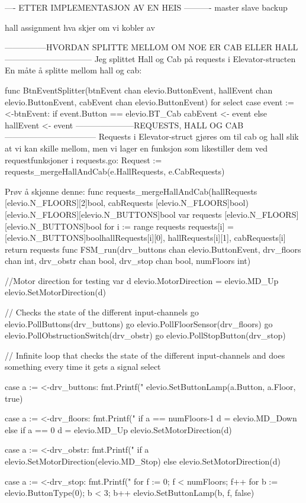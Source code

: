 
---- ETTER IMPLEMENTASJON AV EN HEIS ----------
master slave
backup

hall assignment
hva skjer om vi kobler av


---------------HVORDAN SPLITTE MELLOM OM NOE ER CAB ELLER HALL--------------------------------
Jeg splittet Hall og Cab på requests i Elevator-structen
En måte å splitte mellom hall og cab:

func BtnEventSplitter(btnEvent chan elevio.ButtonEvent,
	hallEvent chan elevio.ButtonEvent,
	cabEvent chan elevio.ButtonEvent) {
	for {
		select {
		case event := <-btnEvent:
			if event.Button == elevio.BT_Cab {
				cabEvent <- event
			} else {
				hallEvent <- event
			}
		}
	}
}
---------------------REQUESTS, HALL OG CAB---------------------------------
Requests i Elevator-struct gjøres om til cab og hall slik at vi kan skille mellom, men vi lager en funksjon 
som likestiller dem ved requestfunksjoner i requests.go:
Request := requests_mergeHallAndCab(e.HallRequests, e.CabRequests)

Prøv å skjønne denne: 
func requests_mergeHallAndCab(hallRequests [elevio.N_FLOORS][2]bool, cabRequests [elevio.N_FLOORS]bool) [elevio.N_FLOORS][elevio.N_BUTTONS]bool {
	var requests [elevio.N_FLOORS][elevio.N_BUTTONS]bool
	for i := range requests {
		requests[i] = [elevio.N_BUTTONS]bool{hallRequests[i][0], hallRequests[i][1], cabRequests[i]}
	}
	return requests
}
func FSM_run(drv_buttons chan elevio.ButtonEvent, drv_floors chan int, drv_obstr chan bool, drv_stop chan bool, numFloors int) {

	//Motor direction for testing
	var d elevio.MotorDirection = elevio.MD_Up
	elevio.SetMotorDirection(d)


	// Checks the state of the different input-channels
	go elevio.PollButtons(drv_buttons)
	go elevio.PollFloorSensor(drv_floors)
	go elevio.PollObstructionSwitch(drv_obstr)
	go elevio.PollStopButton(drv_stop)

	// Infinite loop that checks the state of the different input-channels and does something every time it gets a signal
	select {
	case a := <-drv_buttons:
		fmt.Printf("%
		elevio.SetButtonLamp(a.Button, a.Floor, true)

	case a := <-drv_floors:
		fmt.Printf("%
		if a == numFloors-1 {
			d = elevio.MD_Down
		} else if a == 0 {
			d = elevio.MD_Up
		}
		elevio.SetMotorDirection(d)

	case a := <-drv_obstr:
		fmt.Printf("%
		if a {
			elevio.SetMotorDirection(elevio.MD_Stop)
		} else {
			elevio.SetMotorDirection(d)
		}

	case a := <-drv_stop:
		fmt.Printf("%
		for f := 0; f < numFloors; f++ {
			for b := elevio.ButtonType(0); b < 3; b++ {
				elevio.SetButtonLamp(b, f, false)
			}
		}
	}

}

